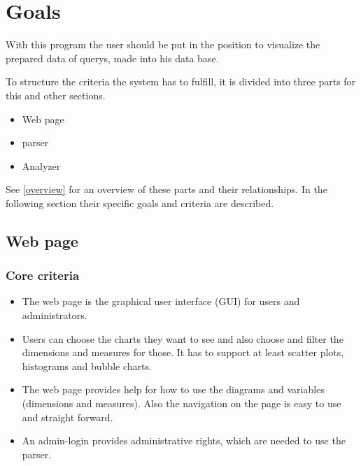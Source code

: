 \section{Goals}


With this program the user should be put in the position 
to visualize the prepared data of \glspl{query}, made into his data base.


To structure the criteria the system has to fulfill, 
it is divided into three parts for this and other sections.
\begin{itemize}
  \item Web page
  \item \gls{parser}
  \item Analyzer
\end{itemize}
See \ref{overview} for an overview of these parts and their relationships.
In the following section their specific goals and criteria are described.
 

% 


\subsection{Web page}
\subsubsection{Core criteria}
\begin{itemize}
\item The web page is the graphical user interface (\gls{GUI}) for users and administrators. 

\item Users can choose the charts they want to see 
and also choose and filter the dimensions and measures for those. 
It has to support at least \glspl{scatter plot}, \glspl{histogram} and \glspl{bubble chart}.

\item The web page provides help for how to use the \glspl{diagram} and variables (\glspl{dimension} 
and measures). 
Also the navigation on the page is easy to use and straight forward.

\item An admin-login provides administrative rights, which are needed to use the \gls{parser}.
\end{itemize}

